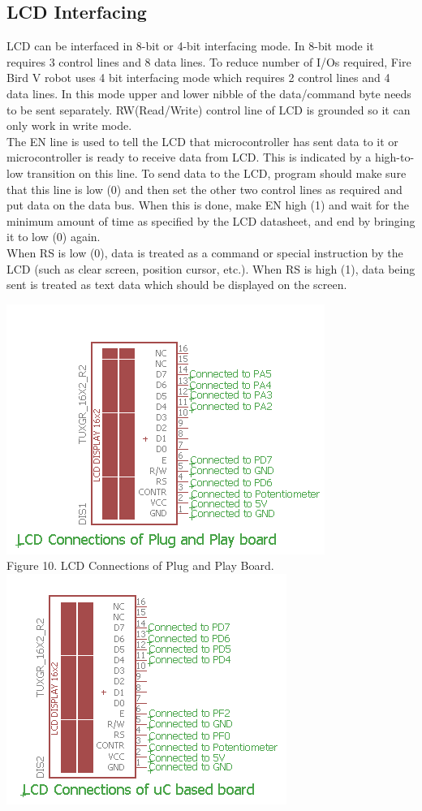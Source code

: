 \documentclass[a4paper,10pt,oneside]{article}
\begin{document}
{	\subsection{\textbf{LCD Interfacing}}{
	LCD can be interfaced in 8-bit or 4-bit interfacing mode. In 8-bit mode it requires 3 control lines
	and 8 data lines. To reduce number of I/Os required, Fire Bird V robot uses 4 bit interfacing
	mode which requires 2 control lines and 4 data lines. In this mode upper and lower nibble of the
	data/command byte needs to be sent separately. RW(Read/Write) control line of LCD is grounded so it can only work in write mode.\\
	The EN line is used to tell the LCD that microcontroller
	has sent data to it or microcontroller is ready to receive data from LCD. This is indicated by a
	high-to-low transition on this line. To send data to the LCD, program should make sure that this
	line is low (0) and then set the other two control lines as required and put data on the data bus.
	When this is done, make EN high (1) and wait for the minimum amount of time as specified by
	the LCD datasheet, and end by bringing it to low (0) again.\\
	When RS is low (0), data is treated as a command or special
	instruction by the LCD (such as clear screen, position cursor, etc.). When RS is high (1), data
	being sent is treated as text data which should be displayed on the screen.}
		\begin{center}
		\includegraphics{Images/lcdPlug} \\
		Figure 10. LCD Connections of Plug and Play Board.\\
		\hspace{2cm}\includegraphics{Images/lcduC} \\

\end{center}}
\end{document}
